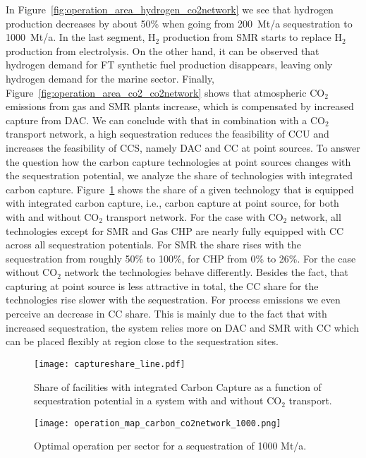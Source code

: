 \documentclass[conference]{IEEEtran}
\newcommand{\carbon}{CO$_2$ }
\begin{document}
In Figure~\ref{fig:operation_area_hydrogen_co2network} we see that hydrogen production decreases by about 50\% when going from 200~Mt/a sequestration to 1000~Mt/a. In the last segment, H$_2$ production from SMR starts to replace H$_2$ production from electrolysis. On the other hand, it can be observed that hydrogen demand for FT synthetic fuel production disappears, leaving only hydrogen demand for the marine sector. Finally, Figure~\ref{fig:operation_area_co2_co2network} shows that atmospheric \carbon emissions from gas and SMR plants increase, which is compensated by increased capture from DAC.
We can conclude with that in combination with a \carbon transport network, a high sequestration reduces the feasibility of CCU and increases the feasibility of CCS, namely DAC and CC at point sources. To answer the question how the carbon capture technologies at point sources changes with the sequestration potential, we analyze the share of technologies with integrated carbon capture.
Figure~\ref{fig:captureshare_line} shows the share of a given technology that is equipped with integrated carbon capture, i.e., carbon capture at point source, for both with and without \carbon transport network.
For the case with \carbon network, all technologies except for SMR and Gas CHP are nearly fully equipped with CC across all sequestration potentials. For SMR the share rises with the sequestration from roughly 50\% to 100\%, for CHP from 0\% to 26\%. For the case without \carbon network the technologies behave differently. Besides the fact, that capturing at point source is less attractive in total, the CC share for the technologies rise slower with the sequestration. For process emissions we even perceive an decrease in CC share. This is mainly due to the fact that with increased sequestration, the system relies more on DAC and SMR with CC which can be placed flexibly at region close to the sequestration sites.

\begin{figure}
    \centering
    \texttt{[image: captureshare\_line.pdf]}
    \caption{Share of facilities with integrated Carbon Capture as a function of sequestration potential in a system with and without \carbon transport.}
    \label{fig:captureshare_line}
\end{figure}



\begin{figure*}[h!]
    \centering
    \texttt{[image: operation\_map\_carbon\_co2network\_1000.png]}
    \caption{Optimal operation per sector for a sequestration of 1000 Mt/a.}
    \label{fig:operation_map_noco2network_1000}
\end{figure*}
\end{document}
